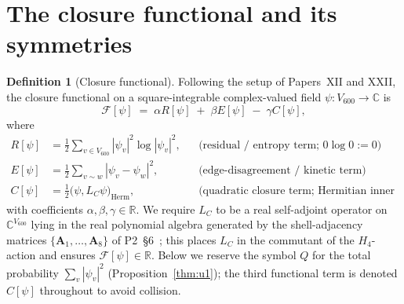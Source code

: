 \documentclass[11pt]{article}
\theoremstyle{definition}
\newtheorem{definition}[theorem]{Definition}
\newcommand{\R}{\mathbb{R}}
\newcommand{\C}{\mathbb{C}}
\newcommand{\Fcal}{\mathcal{F}}
\begin{document}
\section{The closure functional and its symmetries}\label{sec:functional}

\begin{definition}[Closure functional]\label{def:F}
Following the setup of Papers~XII and XXII, the closure functional on a square-integrable complex-valued field $\psi: V_{600} \to \C$ is
\begin{equation}\label{eq:F}
    \Fcal[\psi] \;=\; \alpha R[\psi] \;+\; \beta E[\psi] \;-\; \gamma C[\psi],
\end{equation}
where
\begin{align}
    R[\psi] &= \tfrac{1}{2} \sum_{v \in V_{600}} |\psi_v|^2 \log |\psi_v|^2, &&\text{(residual / entropy term; $0 \log 0 := 0$)}\\
    E[\psi] &= \tfrac{1}{2} \sum_{v \sim w} |\psi_v - \psi_w|^2, &&\text{(edge-disagreement / kinetic term)}\\
    C[\psi] &= \tfrac{1}{2} \bigl(\psi, L_C \psi\bigr)_{\text{Herm}}, &&\text{(quadratic closure term; Hermitian inner product)}
\end{align}
with coefficients $\alpha, \beta, \gamma \in \R$. We require $L_C$ to be a real self-adjoint operator on $\C^{V_{600}}$ lying in the real polynomial algebra generated by the shell-adjacency matrices $\{\mathbf A_1, \ldots, \mathbf A_8\}$ of P2~\S 6~\citep{CascadeAlgSubstrate}; this places $L_C$ in the commutant of the $H_4$-action and ensures $\Fcal[\psi] \in \R$. Below we reserve the symbol $Q$ for the total probability $\sum_v |\psi_v|^2$ (Proposition~\ref{thm:u1}); the third functional term is denoted $C[\psi]$ throughout to avoid collision.
\end{definition}
\end{document}

